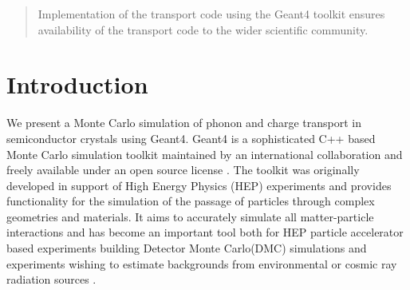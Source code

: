 \documentclass[preprint,12pt]{elsarticle}
\begin{document}
\begin{frontmatter}
\begin{abstract}
Implementation of the transport code using the Geant4 toolkit ensures availability of the transport code to the wider scientific community.

\end{abstract}

\begin{keyword}


\end{keyword}

\end{frontmatter}





\section{Introduction}
\label{sec:Introduction}

We present a Monte Carlo simulation of phonon and charge transport in semiconductor crystals using Geant4. Geant4 is a sophisticated C++ based Monte Carlo simulation toolkit maintained by an international collaboration and freely available under an open source license \cite{Geant-A} \cite{Geant-B}. The toolkit was originally developed in support of High Energy Physics (HEP) experiments and provides functionality for the simulation of the passage of particles through complex geometries and materials. It aims to accurately simulate all matter-particle interactions and has become an important tool both for HEP particle accelerator based experiments building Detector Monte Carlo(DMC) simulations and experiments wishing to estimate backgrounds from environmental or cosmic ray radiation sources \cite{CDMS-D}\cite{Brandt}.
\end{document}
